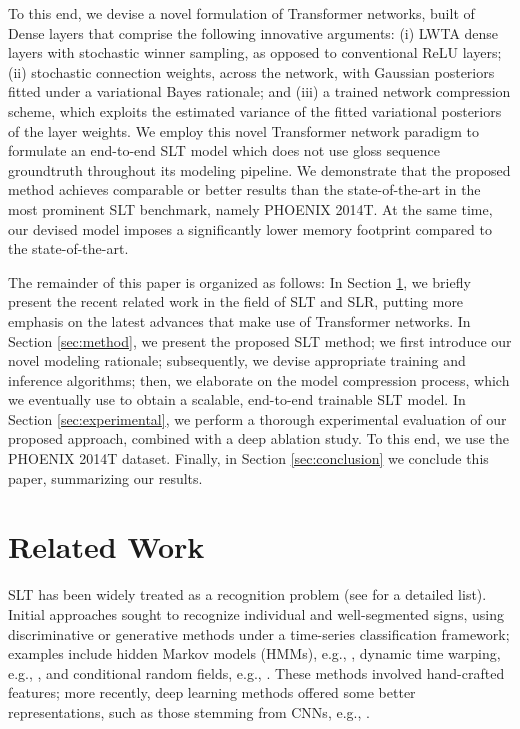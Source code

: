 \documentclass[10pt,twocolumn,letterpaper]{article}
\begin{document}
To this end, we devise a novel formulation of Transformer networks, built of Dense layers that comprise the following innovative arguments: (i) LWTA dense layers with stochastic winner sampling, as opposed to conventional ReLU layers; (ii) stochastic connection weights, across the network, with Gaussian posteriors fitted under a variational Bayes rationale; and (iii) a trained network compression scheme, which exploits the estimated variance of the fitted variational posteriors of the layer weights. We employ this novel Transformer network paradigm to formulate an end-to-end SLT model which does not use gloss sequence groundtruth throughout its modeling pipeline. We demonstrate that the proposed method achieves comparable or better results than the state-of-the-art in the most prominent SLT benchmark, namely PHOENIX 2014T. At the same time, our devised model imposes a significantly lower memory footprint compared to the state-of-the-art.

The remainder of this paper is organized as follows: In Section \ref{sec:soa}, we briefly present the recent related work in the field of SLT and SLR, putting more emphasis on the latest advances that make use of Transformer networks. In Section \ref{sec:method}, we present the proposed SLT method; we first introduce our novel modeling rationale; subsequently, we devise appropriate training and inference algorithms; then, we elaborate on the model compression process, which we eventually use to obtain a scalable, end-to-end trainable SLT model. In Section \ref{sec:experimental}, we perform a thorough experimental evaluation of our proposed approach, combined with a deep ablation study. To this end, we use the PHOENIX 2014T dataset. Finally, in Section \ref{sec:conclusion} we conclude this paper, summarizing our results.   

\section{Related Work}
\label{sec:soa}







SLT has been widely treated as a recognition problem (see \cite{Koller2020quant} for a detailed list). Initial approaches sought to recognize individual and well-segmented signs, using discriminative or generative methods under a time-series classification framework; examples include hidden Markov models (HMMs), e.g., \cite{Chat09, Vogler04, Lang2012}, dynamic time warping, e.g., \cite{Alon09, Licht08}, and conditional random fields, e.g., \cite{Yang2006, Yang2010}. These methods involved hand-crafted features; more recently, deep learning methods offered some better representations, such as those stemming from CNNs, e.g., \cite{Pigou2015,Neverova2016}.
\end{document}
